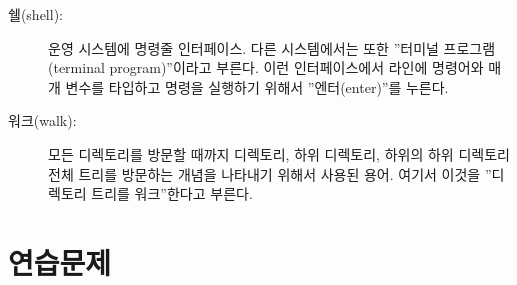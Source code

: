 \begin{description}
\item[쉘(shell):]
운영 시스템에 명령줄 인터페이스. 다른 시스템에서는 또한 ''터미널 프로그램(terminal program)''이라고 부른다.
이런 인터페이스에서 라인에 명령어와 매개 변수를 타입하고 명령을 실행하기 위해서 ''엔터(enter)''를 누른다.

\item[워크(walk):]
모든 디렉토리를 방문할 때까지 디렉토리, 하위 디렉토리, 하위의 하위 디렉토리 전체 트리를 방문하는 개념을 나타내기 위해서 사용된 용어.
여기서 이것을 ''디렉토리 트리를 워크''한다고 부른다.

\end{description}


\section{연습문제}

